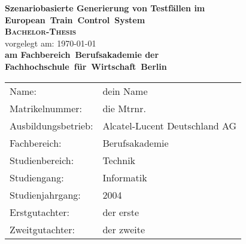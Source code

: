 \begin{titlepage}
    \begin{center}
    \huge \textbf{\textsf{Szenariobasierte Generierung von Testfällen im European~Train~Control~System}} \\
    \vspace{2cm}
    \LARGE\textbf{\textsc{Bachelor-Thesis}}\\
    \vspace{1cm}
    \normalsize
    vorgelegt am: \today \\
    \vspace{2.5cm}
    \large \textbf{am Fachbereich~Berufsakademie der Fachhochschule~für~Wirtschaft~Berlin}\\
    \vspace{3cm}
    \end{center}
 \normalsize{
    \begin{tabular}{ll}
    	Name: & {dein Name} \\
    	Matrikelnummer: & {die Mtrnr.} \\
    	Ausbildungsbetrieb: & Alcatel-Lucent Deutschland AG\\
    	Fachbereich: & Berufsakademie\\
    	Studienbereich: & Technik\\
    	Studiengang: & Informatik\\
    	Studienjahrgang: & 2004\\
      Erstgutachter: & {der erste} \\
      Zweitgutachter: & {der zweite} \\
    \end{tabular}\\
    }
\end{titlepage}